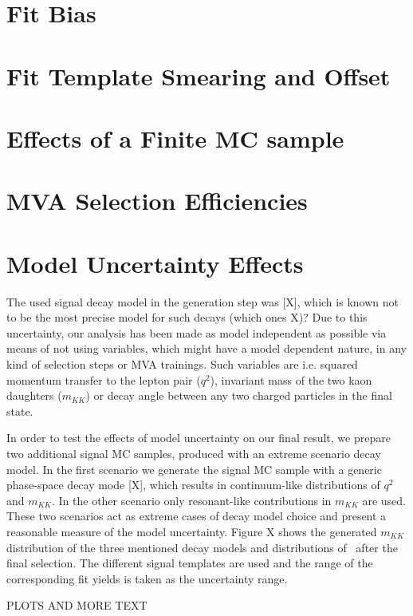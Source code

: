 \section{Fit Bias}

\section{Fit Template Smearing and Offset}

\section{Effects of a Finite MC sample}

\section{MVA Selection Efficiencies}

\section{Model Uncertainty Effects}
The used signal decay model in the generation step was  [X], which is known not to be the most precise model for such decays (which ones X)? Due to this uncertainty, our analysis has been made as model independent as possible via means of not using variables, which might have a model dependent nature, in any kind of selection steps or MVA trainings. Such variables are i.e. squared momentum transfer to the lepton pair ($q^2$), invariant mass of the two kaon daughters ($m_{KK}$) or decay angle between any two charged particles in the final state.

In order to test the effects of model uncertainty on our final result, we prepare two additional signal MC samples, produced with an extreme scenario decay model. In the first scenario we generate the signal MC sample with a generic phase-space decay mode  [X], which results in continuum-like distributions of $q^2$ and $m_{KK}$. In the other scenario only resonant-like contributions in $m_{KK}$ are used. These two scenarios act as extreme cases of decay model choice and present a reasonable measure of the model uncertainty. Figure X shows the generated $m_{KK}$ distribution of the three mentioned decay models and distributions of \vars~after the final selection. The different signal templates are used and the range of the corresponding fit yields is taken as the uncertainty range.

PLOTS AND MORE TEXT